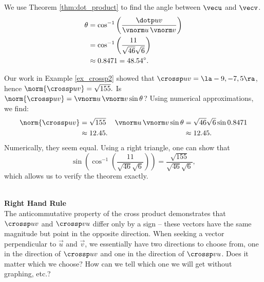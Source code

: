 {We use Theorem \ref{thm:dot_product} to find the angle between $\vecu$ and $\vecv$. 
\begin{align*}
\theta &= \cos^{-1}\left(\frac{\dotp uv}{\vnorm u\, \vnorm v}\right) \\
			&= \cos^{-1}\left(\frac{11}{\sqrt{46}\sqrt{6}}\right)\\
			&\approx 0.8471 = 48.54^\circ.
\end{align*}

Our work in Example \ref{ex_crossp2} showed that $\crossp uv = \la -9,-7,5\ra$, hence $\norm{\crossp uv} = \sqrt{155}.$ Is $\norm{\crossp uv} = \vnorm u\, \vnorm v\sin\theta$? Using numerical approximations, we find:
\begin{align*}
\norm{\crossp uv} &=\sqrt{155}  & \vnorm u\,\vnorm v \sin\theta & = \sqrt{46}\sqrt{6}\sin 0.8471\\
									&\approx 12.45. & &\approx 12.45.
\end{align*}
Numerically, they seem equal. Using a right triangle, one can show that 
$$\sin\left(\cos^{-1}\left(\frac{11}{\sqrt{46}\sqrt{6}}\right)\right) = \frac{\sqrt{155}}{\sqrt{46}\sqrt{6}},$$ which allows us to verify the theorem exactly.
}\\

\noindent\textbf{Right Hand Rule}\\

The anticommutative property of the cross product demonstrates that $\crossp uv$ and $\crossp vu$ differ only by a sign -- these vectors have the same magnitude but point in the opposite direction. When seeking a vector perpendicular to $\vec u$ and $\vec v$, we essentially have two directions to choose from, one in the direction of $\crossp uv$ and one in the direction of $\crossp vu$. Does it matter which we choose? How can we tell which one we will get without graphing, etc.?

